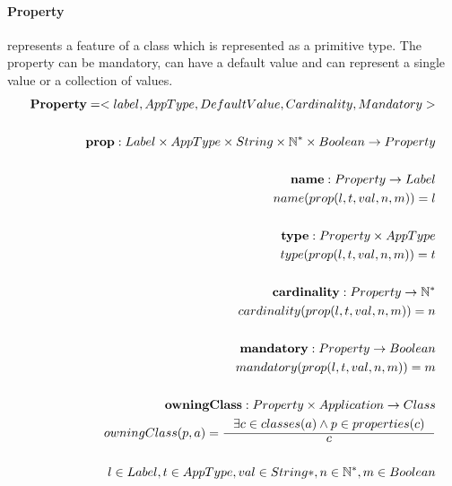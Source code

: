 \documentclass[11pt]{article}
\begin{document}
\paragraph{Property} represents a feature of  a class which is represented as a primitive type. The property can be mandatory, can have a default value and can represent a single value or a collection of values.
\begin{align*}
	\mathbf{Property} = <label, AppType, DefaultValue, Cardinality, Mandatory> \\ \\
	\mathbf{prop} : Label \times AppType \times String \times \mathbb{N^{*}} \times Boolean \rightarrow Property \\ \\
	\mathbf{name} : Property \rightarrow Label \\
	name(prop(l, t, val, n, m)) = l \\ \\
	\mathbf{type} : Property \times AppType \\
	type(prop(l, t, val, n, m)) = t \\ \\
	\mathbf{cardinality} : Property \rightarrow \mathbb{N^{*}} \\
	cardinality(prop(l, t, val, n, m)) = n \\ \\
	\mathbf{mandatory} : Property \rightarrow Boolean \\
	mandatory(prop(l, t, val, n, m)) = m  \\ \\
	\mathbf{owningClass} : Property \times Application \rightarrow Class  \\ 	
	owningClass(p, a) = \inference{\exists c \in classes(a) \wedge p \in properties(c)}{c}  \\ \\
	l \in Label, t \in AppType, val \in String*, n \in \mathbb{N^{*}}, m \in Boolean 
\end{align*}
\end{document}
